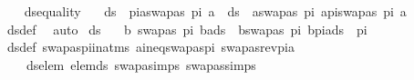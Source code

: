 \begin{isabellebody}
\ \ \isamarkupfalse%
%
\endisatagproof
{\isafoldproof}%
%
\isadelimproof
\isanewline
%
\endisadelimproof
\isanewline
\isanewline
\isanewline
{}\isamarkupfalse%
\ ds{\isacharunderscore}{\kern0pt}equality{\isacharcolon}{\kern0pt}\ \isanewline
\ \ {\isachardoublequoteopen}{\isacharparenleft}{\kern0pt}ds\ {\isacharbrackleft}{\kern0pt}{\isacharbrackright}{\kern0pt}\ pi{\isacharparenright}{\kern0pt}{\isacharminus}{\kern0pt}{\isacharbraceleft}{\kern0pt}a{\isacharcomma}{\kern0pt}swapas\ pi\ a{\isacharbraceright}{\kern0pt}\ {\isacharequal}{\kern0pt}\ {\isacharparenleft}{\kern0pt}ds\ {\isacharbrackleft}{\kern0pt}{\isacharbrackright}{\kern0pt}\ {\isacharparenleft}{\kern0pt}{\isacharparenleft}{\kern0pt}a{\isacharcomma}{\kern0pt}swapas\ pi\ a{\isacharparenright}{\kern0pt}{\isacharhash}{\kern0pt}pi{\isacharparenright}{\kern0pt}{\isacharparenright}{\kern0pt}{\isacharminus}{\kern0pt}{\isacharbraceleft}{\kern0pt}swapas\ pi\ a{\isacharbraceright}{\kern0pt}{\isachardoublequoteclose}\isanewline
%
\isadelimproof
\ \ %
\endisadelimproof
%
\isatagproof
{}\isamarkupfalse%
\ ds{\isacharunderscore}{\kern0pt}def\ \isamarkupfalse%
\ auto%
\endisatagproof
{\isafoldproof}%
%
\isadelimproof
\isanewline
%
\endisadelimproof
\isanewline
\isanewline
{}\isamarkupfalse%
\ ds{\isacharunderscore}{\kern0pt}{}{\isacharcolon}{\kern0pt}\ \isanewline
\ \ {\isachardoublequoteopen}{\isasymlbrakk}b{\isasymnoteq}\ swapas\ pi\ b{\isacharsemicolon}{\kern0pt}a{\isasymin}ds\ {\isacharbrackleft}{\kern0pt}{\isacharbrackright}{\kern0pt}\ {\isacharparenleft}{\kern0pt}{\isacharparenleft}{\kern0pt}b{\isacharcomma}{\kern0pt}swapas\ pi\ b{\isacharparenright}{\kern0pt}{\isacharhash}{\kern0pt}pi{\isacharparenright}{\kern0pt}{\isasymrbrakk}{\isasymLongrightarrow}a{\isasymin}ds\ {\isacharbrackleft}{\kern0pt}{\isacharbrackright}{\kern0pt}\ pi{\isachardoublequoteclose}\isanewline
%
\isadelimproof
\ \ %
\endisadelimproof
%
\isatagproof
{}\isamarkupfalse%
\ ds{\isacharunderscore}{\kern0pt}def\ swapas{\isacharunderscore}{\kern0pt}pi{\isacharunderscore}{\kern0pt}in{\isacharunderscore}{\kern0pt}atms\ a{\isacharunderscore}{\kern0pt}ineq{\isacharunderscore}{\kern0pt}swapas{\isacharunderscore}{\kern0pt}pi\ swapas{\isacharunderscore}{\kern0pt}rev{\isacharunderscore}{\kern0pt}pi{\isacharunderscore}{\kern0pt}a\ \isanewline
\ \ \ \ ds{\isacharunderscore}{\kern0pt}elem\ elem{\isacharunderscore}{\kern0pt}ds\ swapa{\isachardot}{\kern0pt}simps\ swapas{\isachardot}{\kern0pt}simps{\isacharparenleft}{\kern0pt}{}{\isacharparenright}{\kern0pt}\isanewline

\end{isabellebody}
